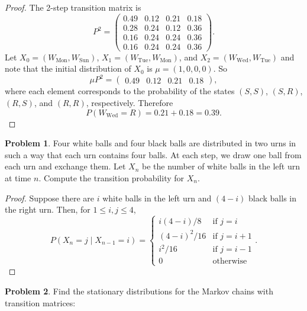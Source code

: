 \documentclass[oneside,reqno]{amsart}
\theoremstyle{definition}
\newtheorem{prob}{Problem}
\begin{document}
\begin{enumerate}
\begin{proof}
The 2-step transition matrix is 
\[
	P^2 = \begin{pmatrix}
		0.49 & 0.12 & 0.21 & 0.18 \\
		0.28 & 0.24 & 0.12 & 0.36 \\
		0.16 & 0.24 & 0.24 & 0.36 \\
		0.16 & 0.24 & 0.24 & 0.36 
	\end{pmatrix}.
\]
Let $X_0 = (W_\text{Mon}, W_\text{Sun})$, $X_1 = (W_\text{Tue}, W_\text{Mon})$, and $X_2 = (W_\text{Wed}, W_\text{Tue})$ and note that the initial distribution of $X_0$ is $\mu = (1, 0, 0, 0)$. So
\[
	\mu P^2 = \begin{pmatrix}
		0.49 & 0.12 & 0.21 & 0.18 
	\end{pmatrix},
\]
where each element corresponds to the probability of the states $(S,S)$, $(S,R)$, $(R,S)$, and $(R,R)$, respectively. Therefore 
\[
	P(W_\text{Wed} = R) = 0.21 + 0.18  = 0.39.
\]
\end{proof}
\end{enumerate}


\begin{prob}
Four white balls and four black balls are distributed in two urns in such a way that each urn contains four balls. At each step, we draw one ball from each urn and exchange them. Let $X_n$ be the number of white balls in the left urn at time $n$. Compute the transition probability for $X_n$. 
\end{prob}

\begin{proof}
Suppose there are $i$ white balls in the left urn and $(4-i)$ black balls in the right urn. Then, for $1 \leq i,j \leq 4$, 
\[
	P(X_n = j \mid  X_{n-1} = i) = 
	\begin{cases}
		i(4-i) / 8 & \text{if } j = i \\
		(4-i)^2 / 16 & \text{if } j = i + 1 \\
		i^2 / 16 & \text{if } j = i -1 \\
		0 & \text{otherwise}
	\end{cases}.
\]
\end{proof}


\begin{prob}
Find the stationary distributions for the Markov chains with transition matrices:
\end{prob}
\end{document}
